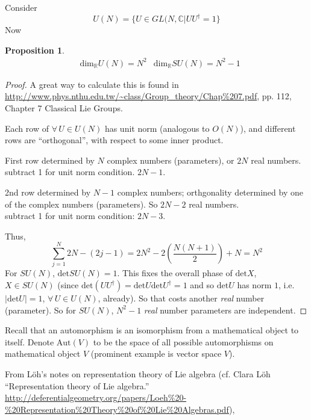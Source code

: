 \documentclass[10pt]{amsart}
\newtheorem{proposition}{Proposition}
\begin{document}
Consider 
\[
U(N) = \lbrace U \in GL(N,\mathbb{C} | UU^{\dag} = 1\rbrace
\]
Now
\begin{proposition}
  \[
\begin{aligned}
& \text{dim}_{\mathbb{R}}U(N) = N^2
& \text{dim}_{\mathbb{R}}SU(N) = N^2 -1
\end{aligned}
\]
\end{proposition}
\begin{proof}
A great way to calculate this is found in \url{http://www.phys.nthu.edu.tw/~class/Group_theory/Chap%207.pdf}, pp. 112, Chapter 7 Classical Lie Groups.  

Each row of $\forall \, U \in U(N)$ has unit norm (analogous to $O(N)$), and different rows are ``orthogonal'', with respect to some inner product.  

First row determined by $N$ complex numbers (parameters), or $2N$ real numbers.  \\
\phantom{First} subtract 1 for unit norm condition.  $2N-1$.  

2nd row determined by $N-1$ complex numbers; orthgonality determined by one of the complex numbers (parameters).  So $2N-2$ real numbers. \\
\phantom{First} subtract 1 for unit norm condition: $2N-3$.  

Thus,
\[
\sum_{j=1}^N 2N - (2j - 1) = 2N^2 - 2\left( \frac{N(N+1)}{2} \right)  + N = N^2
\]
For $SU(N)$, $\text{det}SU(N) =1$.  This fixes the overall phase of $\text{det}X$, $X\in SU(N)$ (since $\text{det}(UU^{\dag}) = \text{det}U \text{det}U^{\dag} = 1$ and so $\text{det}U$ has norm $1$, i.e. $|\text{det}U|=1$, $\forall \, U \in U(N)$, already).  So that costs another \emph{real} number (parameter).  So for $SU(N)$, $N^2-1$ \emph{real} number parameters are independent.  

\end{proof}

Recall that an automorphism is an isomorphism from a mathematical object to itself.  Denote $\text{Aut}(V)$ to be the space of all possible automorphisms on mathematical object $V$ (prominent example is vector space $V$).  


From L\"{o}h's notes on representation theory of Lie algebra (cf. Clara L\"{o}h ``Representation theory of Lie algebra.''  \url{http://deferentialgeometry.org/papers/Loeh%20-%20Representation%20Theory%20of%20Lie%20Algebras.pdf}), 
\end{document}
